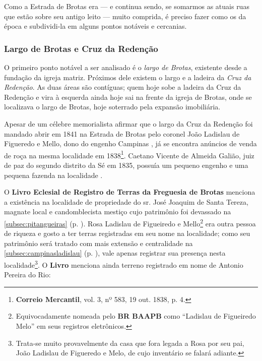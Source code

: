 Como a Estrada de Brotas era --- e continua sendo, se somarmos as atuais ruas que estão sobre seu antigo leito --- muito comprida, é preciso fazer como os da época e subdividi-la em alguns pontos notáveis e cercanias.

\subsubsection{Largo de Brotas e Cruz da Redenção}\label{subsubsec:brotasredencao}

O primeiro ponto notável a ser analisado é o \textit{largo de Brotas}, existente desde a fundação da igreja matriz. Próximos dele existem o largo e a ladeira da \textit{Cruz da Redenção}. As duas áreas são contíguas; quem hoje sobe a ladeira da Cruz da Redenção e vira à esquerda ainda hoje sai na frente da igreja de Brotas, onde se localizava o largo de Brotas, hoje soterrado pela expansão imobiliária.

Apesar de um célebre memorialista afirmar que o largo da Cruz da Redenção foi mandado abrir em 1841 na Estrada de Brotas pelo coronel João Ladislau de Figueredo e Mello, dono do engenho Campinas \cite[p.~88]{campos_brotas_1942}, já se encontra anúncios de venda de roça na mesma localidade em 1838\footnote{\textbf{Correio Mercantil}, vol. 3, nº 583, 19 out. 1838, p. 4.}. Caetano Vicente de Almeida Galião, juiz de paz do segundo distrito da Sé em 1835, possuía um pequeno engenho e uma pequena fazenda na localidade \cite[p.~239]{REIS2004males}.

O \textbf{Livro Eclesial de Registro de Terras da Freguesia de Brotas} menciona a existência na localidade de propriedade do sr. José Joaquim de Santa Tereza, magnate local e candomblecista mestiço cujo patrimônio foi devassado na \autoref{subsec:pitangueiras} (p. \pageref{subsec:pitangueiras}). Rosa Ladislau de Figueiredo e Mello\footnote{Equivocadamente nomeada pelo \textbf{BR BAAPB} como ``Ladislau de Figueiredo Melo'' em seus registros eletrônicos.} era outra pessoa de riqueza e gosto a ter terras registradas em seu nome na localidade; como seu patrimônio será tratado com mais extensão e centralidade na \autoref{subsec:campinasladislau} (p. \pageref{subsec:campinasladislau}), vale apenas registrar sua presença nesta localidade\footnote{Trata-se muito provavelmente da casa que fora legada a Rosa por seu pai, João Ladislau de Figueredo e Melo, de cujo inventário se falará adiante.}. O \textbf{Livro} menciona ainda terreno registrado em nome de Antonio Pereira do Rio:

